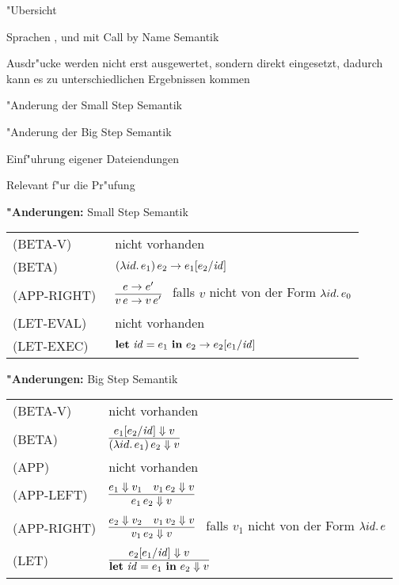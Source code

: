 {
  \begin{itemgroup}{"Ubersicht}
    \item Sprachen \LZEROCBN, \LONECBN und \LTWOCBN  mit Call by Name Semantik
    \item Ausdr"ucke werden nicht erst ausgewertet, sondern direkt eingesetzt,
          dadurch kann es zu unterschiedlichen Ergebnissen kommen
    \item "Anderung der Small Step Semantik
    \item "Anderung der Big Step Semantik
    \item Einf"uhrung eigener Dateiendungen
    \item Relevant f"ur die Pr"ufung \glqq \TPONE \grqq
  \end{itemgroup}
}


{
  {\bf "Anderungen:} Small Step Semantik\\[5mm]
  \begin{tabular}{ll}
     \mbox{(BETA-V)}      & nicht vorhanden \\[3mm]
     \mbox{(BETA)}        & $(\lambda id.\,e_1)\,e_2 \to e_1[e_2/{\text{\it id\/}}]$ \\[3mm]
     \mbox{(APP-RIGHT)\ } & $\regel{e \to e'}
                                   {v\,e \to v\,e'}$ \ 
                                   falls ${v}$ nicht von der Form $\lambda id.\,e_0$ \\[5mm]
     \mbox{(LET-EVAL)\  } & nicht vorhanden \\[3mm]
     \mbox{(LET-EXEC)}    & $\textbf{let}\ {\text{\it id\/}} = e_1\ \textbf{in}\ e_2 \to e_2[e_1/{\text{\it id\/}}]$ \\[3mm]
  \end{tabular}
}


{
  {\bf "Anderungen:} Big Step Semantik\\[5mm]
  \begin{tabular}{ll}
     \mbox{(BETA-V)}      & nicht vorhanden \\[3mm]
     \mbox{(BETA)}        & $\regel{e_1[e_2/\id] \eval v}
                                   {(\abstr{id}{e_1})\,e_2 \eval v}$ \\[5mm]
     \mbox{(APP)}         & nicht vorhanden \\[3mm]
     \mbox{(APP-LEFT)}    & $\regel{e_1 \eval v_1 \quad v_1\,e_2 \eval v}
                                   {e_1\,e_2 \eval v}$ \\[5mm]
     \mbox{(APP-RIGHT)}   & $\regel{e_2 \eval v_2 \quad v_1\,v_2 \eval v}
                                   {v_1\,e_2 \eval v}$ \ 
                                   falls ${v_1}$ nicht von der Form $\lambda id.\,e$ \\[5mm]
     \mbox{(LET)}         & $\regel{e_2[e_1/\id] \eval v}
                                   {\bli{\id}{e_1}{e_2} \eval v}$ \\[5mm]
  \end{tabular}
}


